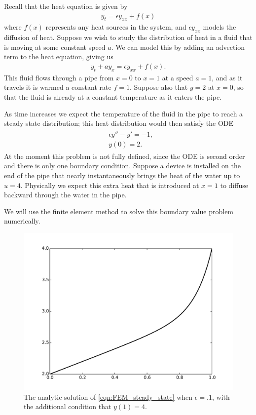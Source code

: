 \label{lab:FEM}
Recall that the heat equation is given by
\begin{align*}
y_t = \epsilon y_{xx} + f(x) %
\end{align*}
where $f(x)$ represents any heat sources in the system, and $\epsilon y_{xx}$ models the diffusion of heat.
Suppose we wish to study the distribution of heat in a fluid that is moving at some constant speed $a$.
We can model this by adding an advection term to the heat equation, giving us
\begin{align*}
y_t + ay_x = \epsilon y_{xx} + f(x).
\end{align*}
This fluid flows through a pipe from $x = 0$ to $x = 1$ at a speed $a = 1$, and as it travels it is warmed a constant rate $f= 1$.
Suppose also that $y = 2$ at $x = 0$, so that the fluid is already at a constant temperature as it enters the pipe.

As time increases we expect the temperature of the fluid in the pipe to reach a steady state distribution; this heat distribution would then satisfy the ODE
\begin{align}
\begin{split}
&{ } \epsilon y'' - y' = -1,\\
&{ } y(0) = 2.
\end{split}\label{eqn:FEM_steady_state}
\end{align}
At the moment this problem is not fully defined, since the ODE is second order and there is only one boundary condition.
Suppose a device is installed on the end of the pipe that nearly instantaneously brings the heat of the water up to $u = 4$.
Physically we expect this extra heat that is introduced at $x = 1$ to diffuse backward through the water in the pipe.

We will use the finite element method to solve this boundary value problem numerically.

\begin{figure}[ht]
\centering
\includegraphics[width=\textwidth]{FEM_solution.pdf}
\caption{The analytic solution of \eqref{eqn:FEM_steady_state} when $\epsilon = .1$, with the additional condition that $y(1) = 4$.}
\label{fig:FEM_analytic_solution}
\end{figure}

